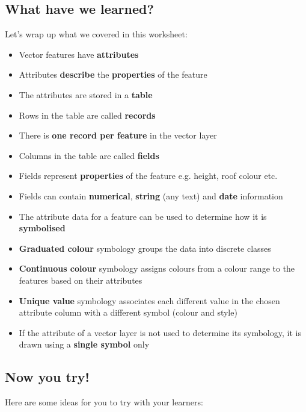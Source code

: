 \subsection{What have we learned?}

Let's wrap up what we covered in this worksheet:

\begin{itemize}
\item Vector features have \textbf{attributes}
\item Attributes \textbf{describe} the \textbf{properties} of the feature
\item The attributes are stored in a \textbf{table}
\item Rows in the table are called \textbf{records}
\item There is \textbf{one record per feature} in the vector layer
\item Columns in the table are called \textbf{fields}
\item Fields represent \textbf{properties} of the feature e.g. height, roof
colour etc.
\item Fields can contain \textbf{numerical}, \textbf{string} (any text) and
\textbf{date} information
\item The attribute data for a feature can be used to determine how it is
\textbf{symbolised}
\item \textbf{Graduated colour} symbology groups the data into discrete classes
\item \textbf{Continuous colour} symbology assigns colours from a colour
range to the features based on their attributes
\item \textbf{Unique value} symbology associates each different value in the
chosen attribute column with a different symbol (colour and style)
\item If the attribute of a vector layer is not used to determine its symbology, it
is drawn using a \textbf{single symbol} only
\end{itemize}

\subsection{Now you try!}

Here are some ideas for you to try with your learners:

